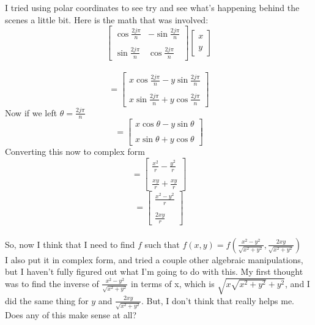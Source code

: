 \documentclass{amsart}
\begin{document}
I tried using polar coordinates to see try and see what's happening behind the scenes a little bit. Here is the math that was involved:
\[ \begin{bmatrix}
		\cos\frac{2j\pi}{n} & -\sin\frac{2j\pi}{n} \\
		\\	
		\sin\frac{2j\pi}{n} & \cos\frac{2j\pi}{n}
	\end{bmatrix} 
	\begin{bmatrix}
		x \\
		\\
		y
	\end{bmatrix} 
\]
\\
\[
	=
	\begin{bmatrix}
		x\cos\frac{2j\pi}{n} - y\sin\frac{2j\pi}{n} \\
		\\
		x\sin\frac{2j\pi}{n} + y\cos\frac{2j\pi}{n}
	\end{bmatrix}
\]
Now if we left $\theta = \frac{2j\pi}{n}$
\[
	=
	\begin{bmatrix}
		x\cos\theta - y\sin\theta \\
		\\
		x\sin\theta + y\cos\theta 
	\end{bmatrix}
\]
Converting this now to complex form
\[
	=
	\begin{bmatrix}
		\frac{x^2}{r} - \frac{y^2}{r} \\
		\\
		\frac{xy}{r} + \frac{xy}{r}
	\end{bmatrix}
\]
\[
	=
	\begin{bmatrix}
	\frac{x^2-y^2}{r} \\
	\\
	\frac{2xy}{r}
	\end{bmatrix}
\]
\\
So, now I think that I need to find $f$ such that $f(x,y) =  f\left(\frac{x^2-y^2}{\sqrt{x^2+y^2}}, \frac{2xy}{\sqrt{x^2+y^2}} \right) $ \\
I also put it in complex form, and tried a couple other algebraic manipulations, but I haven't fully figured out what I'm going to do with this. My first thought was to find the inverse of $\frac{x^2-y^2}{\sqrt{x^2+y^2}}$ in terms of x, which is $\sqrt{x\sqrt{x^2+y^2}+y^2}$, and I did the same thing for $y$ and $\frac{2xy}{\sqrt{x^2+y^2}}$. But, I don't think that really helps me. Does any of this make sense at all? 
\end{document}
